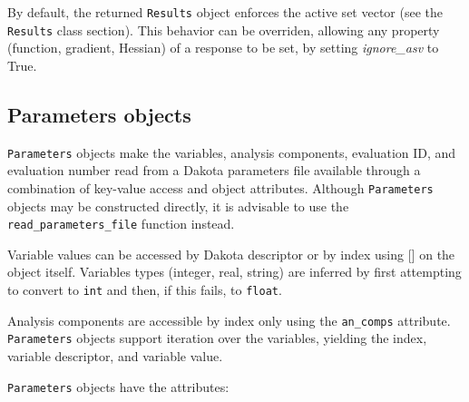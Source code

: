By default, the returned {\tt Results} object enforces the active set vector (see the {\tt Results} class section). This behavior can be overriden, allowing any property (function, gradient, Hessian) of a response to be set, by setting \emph{ignore\_asv} to True.


\subsection{Parameters objects}

{\tt Parameters} objects make the variables, analysis components, evaluation ID, and evaluation number read from a Dakota parameters file available through a combination of key-value access and object attributes. Although {\tt Parameters} objects may be constructed directly, it is advisable to use the {\tt read\_parameters\_file} function instead.

Variable values can be accessed by Dakota descriptor or by index using {[}{]} on the object itself. Variables types (integer, real, string) are inferred by first attempting to convert to {\tt int} and then, if this fails, to {\tt float}.

Analysis components are accessible by index only using the {\tt an\_comps} attribute. {\tt Parameters} objects support iteration over the variables, yielding the index, variable descriptor, and variable value.

{\tt Parameters} objects have the attributes:

